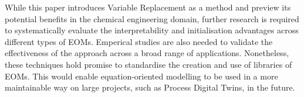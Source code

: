 While this paper introduces Variable Replacement as a method and preview
its potential benefits in the chemical engineering domain, further research is required to systematically
evaluate the interpretability and initialisation advantages across
different types of EOMs. Emperical studies are also needed to validate the effectiveness of
the approach across a broad range of applications. Nonetheless, these techniques hold promise to
standardise the creation and use of libraries of EOMs. This would enable
equation-oriented modelling to be used in a more maintainable way on
large projects, such as Process Digital Twins, in the future.

\newpage
